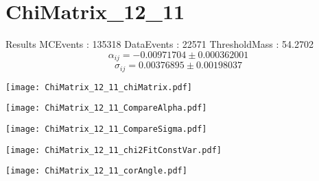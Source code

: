 \documentclass[a4paper,12pt]{article}
\begin{document}
\section{ChiMatrix\_12\_11}
\begin{minipage}{0.49\linewidth} Results \newline
MCEvents : 135318\newline
DataEvents : 22571 \newline
ThresholdMass : 54.2702\\
$$\alpha_{ij} = -0.00971704\pm 0.000362001$$
$$\sigma_{ij} = 0.00376895\pm 0.00198037$$
\end{minipage}\hfill
\begin{minipage}{0.49\linewidth} 
\texttt{[image: ChiMatrix\_12\_11\_chiMatrix.pdf]}\\
\end{minipage}
\hfill
\begin{minipage}{0.49\linewidth} 
\texttt{[image: ChiMatrix\_12\_11\_CompareAlpha.pdf]}\\
\end{minipage}
\hfill
\begin{minipage}{0.49\linewidth} 
\texttt{[image: ChiMatrix\_12\_11\_CompareSigma.pdf]}\\
\end{minipage}
\begin{minipage}{0.49\linewidth} 
\texttt{[image: ChiMatrix\_12\_11\_chi2FitConstVar.pdf]}\\
\end{minipage}
\hfill
\begin{minipage}{0.49\linewidth} 
\texttt{[image: ChiMatrix\_12\_11\_corAngle.pdf]}\\
\end{minipage}
\end{document}
